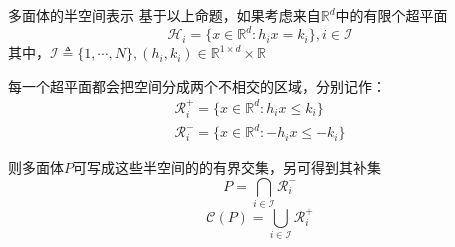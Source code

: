 \documentclass[notheorems,11pt]{beamer}
\theoremstyle{plain}
\numberwithin{theorem}{section}
\numberwithin{lemma}{section}
\numberwithin{corollary}{section}
\theoremstyle{example}
\begin{document}
\begin{frame}{多面体的半空间表示}
    基于以上命题，如果考虑来自$\mathbb{R}^d$中的有限个超平面
  \begin{equation}
    \mathcal{H}_i=\{x\in\mathbb{R}^d:h_ix=k_i\},i\in\mathcal{I}
  \end{equation}
  其中，$\mathcal{I}\triangleq \{1,\cdots,N\},(h_i,k_i)\in\mathbb{R}^{1\times d}\times\mathbb{R}$\par
  每一个超平面都会把空间分成两个不相交的区域，分别记作：
  \begin{subequations}
    \begin{gather}
    \mathcal{R}^+_i=\{x\in\mathbb{R}^d:h_ix\leqslant k_i\} \\
    \mathcal{R}^-_i=\{x\in\mathbb{R}^d:-h_ix\leqslant -k_i\}
  \end{gather}
  \end{subequations}\par
  则多面体$P$可写成这些半空间的的有界交集，另可得到其补集
  \begin{equation}
      P=\bigcap_{i\in\mathcal{I}}{\mathcal{R}^{-}_i}
  \end{equation}
  \begin{equation}
        \mathcal{C}(P)=\bigcup_{i\in\mathcal{I}}{\mathcal{R}^{+}_i} \label{6}
  \end{equation}

\end{frame}
\end{document}
